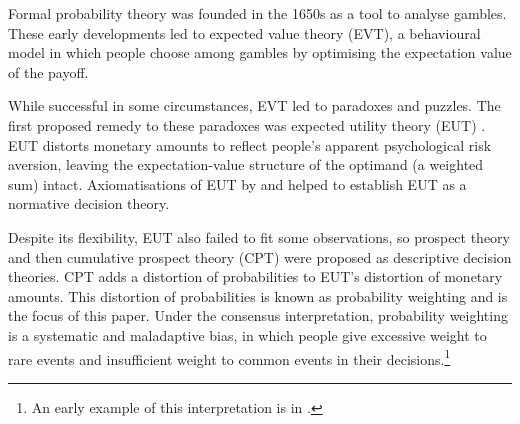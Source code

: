 \documentclass[a4paper, 12pt]{article}
\newcommand{\person}[1]{\textsc{#1}\xspace}
\newcommand{\ie}{\textit{i.e.}\xspace}
\newcommand{\eg}{\textit{e.g.}\xspace}
\begin{document}

Formal probability theory was founded in the 1650s as a tool to analyse gambles. These early developments led to expected value theory (EVT), a behavioural model in which people choose among gambles by optimising the expectation value of the payoff.


While successful in some circumstances, EVT led to paradoxes and puzzles. The first proposed remedy to these paradoxes was expected utility theory (EUT) \parencite{Bernoulli1738,Laplace1814}. EUT distorts monetary amounts to reflect people's apparent psychological risk aversion, leaving the expectation-value structure of the optimand (a weighted sum) intact. Axiomatisations of EUT by \textcite{vonNeumannMorgenstern1944} and \textcite{Savage1954} helped to establish EUT as a normative decision theory.

Despite its flexibility, EUT also failed to fit some observations, so prospect theory \parencite{KahnemanTversky1979} and then cumulative prospect theory (CPT) \parencite{TverskyKahneman1992} were proposed as descriptive decision theories. CPT adds a distortion of probabilities to EUT's distortion of monetary amounts. This distortion of probabilities is known as probability weighting and is the focus of this paper. Under the consensus interpretation, probability weighting is a systematic and maladaptive bias, in which people give excessive weight to rare events and insufficient weight to common events in their decisions.\footnote{An early example of this interpretation is in \textcite[Fig. 1, p. 188]{PrestonBaratta1948}.}
\end{document}
